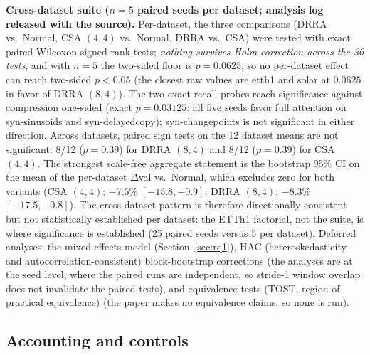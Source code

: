 \textbf{Cross-dataset suite ($n{=}5$ paired seeds per dataset; analysis log
released with the source).} Per-dataset, the three comparisons
(DRRA vs.\ Normal, CSA $(4,4)$ vs.\ Normal, DRRA vs.\ CSA) were tested with
exact paired Wilcoxon signed-rank tests; \emph{nothing survives Holm
correction across the 36 tests}, and with $n{=}5$ the two-sided floor is
$p = 0.0625$, so no per-dataset effect can reach two-sided $p < 0.05$ (the closest
raw values are etth1 and solar at $0.0625$ in favor of DRRA $(8,4)$). The two exact-recall
probes reach significance against compression one-sided (exact $p = 0.03125$: all five
seeds favor full attention on syn-sinusoids and syn-delayedcopy); syn-changepoints is not
significant in either direction. Across
datasets, paired sign tests on the 12 dataset means are not significant:
8/12 ($p = 0.39$) for DRRA $(8,4)$ and 8/12 ($p = 0.39$) for CSA $(4,4)$.
The strongest scale-free aggregate statement is the bootstrap 95\% CI on
the mean of the per-dataset $\Delta$val vs.\ Normal, which excludes zero
for both variants (CSA $(4,4)$: $-7.5\%$ $[-15.8, -0.9]$; DRRA $(8,4)$:
$-8.3\%$ $[-17.5, -0.8]$). The cross-dataset pattern is therefore
directionally consistent but not statistically established per dataset:
the ETTh1 factorial, not the suite, is where significance is established (25 paired seeds versus 5 per dataset).
Deferred analyses: the mixed-effects model (Section~\ref{sec:rq1}),
HAC (heteroskedasticity- and autocorrelation-consistent)
block-bootstrap corrections (the analyses are at the seed level, where the
paired runs are independent, so stride-1 window overlap does not invalidate the
paired tests), and equivalence tests (TOST, region of practical equivalence)
(the paper makes no equivalence claims, so none is run).

\subsection{Accounting and controls}
\label{sec:controls}

